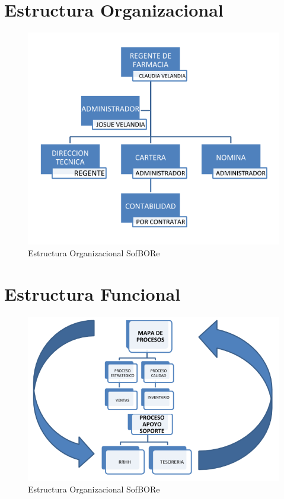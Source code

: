\section{Estructura Organizacional}
\begin{figure}[htb]
	\centering
	 \includegraphics[width=1.0\linewidth]{capitulo2/img/OrgRuzvel.PNG}
	\caption{Estructura Organizacional SofBORe}
\end{figure}
\newpage


\section{Estructura Funcional}
\begin{figure}[htb]
	\centering
	\includegraphics[width=1.0\linewidth]{capitulo2/img/ProcesosRuzvel.PNG}
	\caption{Estructura Organizacional SofBORe}
\end{figure}
